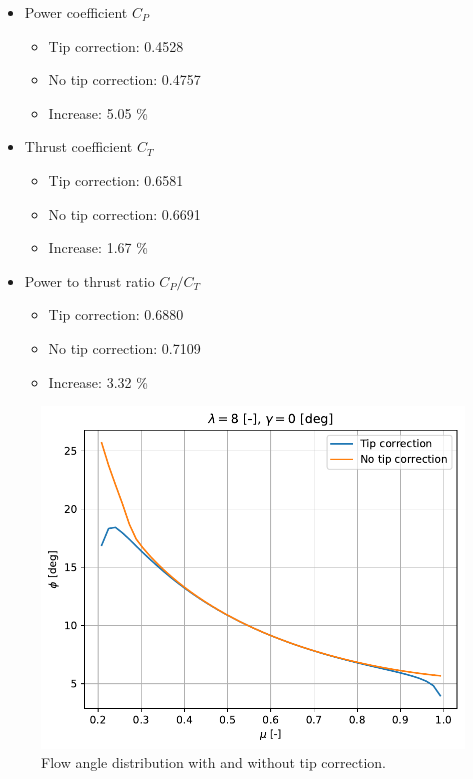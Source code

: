 \begin{itemize}
	
	\item Power coefficient $ C_P $
	\begin{itemize}
		\item Tip correction: 0.4528
		\item No tip correction: 0.4757
		\item Increase: 5.05 \%
	\end{itemize}
	
	\item Thrust coefficient $ C_T $
	\begin{itemize}
		\item Tip correction: 0.6581
		\item No tip correction: 0.6691
		\item Increase: 1.67 \%
	\end{itemize}
	
	\item Power to thrust ratio $ C_P/C_T $
	\begin{itemize}
		\item Tip correction: 0.6880
		\item No tip correction: 0.7109
		\item Increase: 3.32 \%
	\end{itemize}
	
\end{itemize}

\begin{figure}[htbp]
	\centering
	\includegraphics[height=0.45\textheight]{./img/tip-correction/phi.pdf}
	\caption{Flow angle distribution with and without tip correction.}
	\label{img:tc-phi}
\end{figure}

